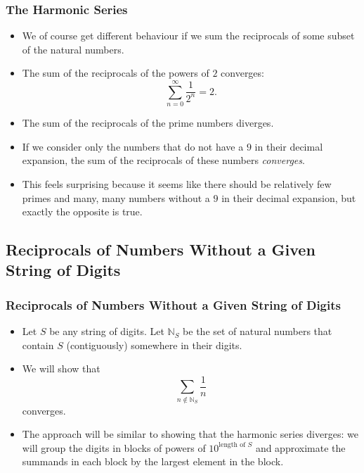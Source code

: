 \documentclass{beamer}
\begin{document}
\begin{frame}
    \frametitle{The Harmonic Series}

    \begin{itemize}
        \item We of course get different behaviour if we sum the reciprocals of some subset of the natural numbers. \pause
        \item The sum of the reciprocals of the powers of $2$ converges:
        \[
            \sum_{n = 0}^{\infty} \frac{1}{2^n} = 2.
        \]
        \pause
        \item The sum of the reciprocals of the prime numbers diverges. \pause
        \item If we consider only the numbers that do not have a $9$ in their decimal expansion, the sum of the reciprocals of these numbers \emph{converges}. \pause
        \item This feels surprising because it seems like there should be relatively few primes and many, many numbers without a $9$ in their decimal expansion, but exactly the opposite is true.
    \end{itemize}

\end{frame}

\subsection{Reciprocals of Numbers Without a Given String of Digits}

\begin{frame}
    \frametitle{Reciprocals of Numbers Without a Given String of Digits}

    \begin{itemize}
        \item Let $S$ be any string of digits. Let $\mathbb{N}_S$ be the set of natural numbers that contain $S$ (contiguously) somewhere in their digits. \pause
        \item We will show that
        \[
            \sum_{n \not\in \mathbb{N}_S} \frac{1}{n}
        \]
        converges. \pause
        \item The approach will be similar to showing that the harmonic series diverges: we will group the digits in blocks of powers of $10^{\text{length of } S}$ and approximate the summands in each block by the largest element in the block.
    \end{itemize}

\end{frame}
\end{document}
